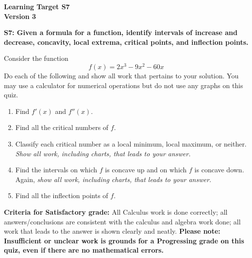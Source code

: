 \documentclass[10pt]{article}
\begin{document}
	\vspace*{0in}

		\begin{center}
			\textbf{Learning Target S7 \\
			Version 3} 
		\end{center}


\begin{framed}
	\textbf{S7: Given a formula for a function, identify intervals of increase and decrease, concavity, local extrema, critical points, and inflection points.}
\end{framed}

Consider the function 
$$f\left( x \right) = 2{x^3} - 9{x^2} - 60x$$
Do each of the following and show all work that pertains to your solution. You may use a calculator for numerical operations but do not use any graphs on this quiz. 
\begin{enumerate}
    \item Find $f'(x)$ and $f''(x)$. 
    \item Find all the critical numbers of $f$.
    \item Classify each critical number as a local minimum, local maximum, or neither. \emph{Show all work, including charts, that leads to your answer.} 
    \item Find the intervals on which $f$ is concave up and on which $f$ is concave down. Again, \emph{show all work, including charts, that leads to your answer.} 
    \item Find all the inflection points of $f$. 
\end{enumerate}

\vfill


\begin{small}
    \begin{framed}
        	\textbf{Criteria for Satisfactory grade:} All Calculus work is done correctly; all answers/conclusions are consistent with the calculus and algebra work done; all work that leads to the answer is shown clearly and neatly. \textbf{Please note: Insufficient or unclear work is grounds for a Progressing grade on this quiz, even if there are no mathematical errors.}
    \end{framed}

\end{small}
\end{document}
